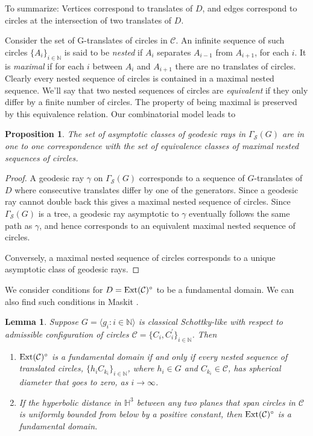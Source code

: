 \documentclass[12pt]{amsart}
\theoremstyle{plain}
\newtheorem{prop}[thm]{Proposition}
\newtheorem{lem}[thm]{Lemma}
\DeclareMathOperator{\Ext}{\rm Ext}
\begin{document}
To summarize: Vertices correspond to translates of $D$, and edges  correspond to circles at the intersection of two translates of $D$. 

  Consider the set of G-translates of circles in 
$\mathcal{C}$. An infinite sequence of such circles $\{A_i\}_{i \in \mathbb N}$ is said to be {\it nested} if $A_i$ separates  $A_{i-1}$ from $A_{i+1}$, for each $i$. It is 
{\it maximal} if for each $i$ between $A_i$ and $A_{i+1}$ there are no translates of circles.                                                                               
Clearly every nested sequence of circles is contained in a maximal nested sequence.  We'll say that two nested sequences of circles are {\it equivalent} if they only differ by a finite number of circles. The property of being maximal is preserved by this equivalence relation. 
Our combinatorial model leads to

\begin{prop}
The set of asymptotic classes of geodesic rays  in 
$\Gamma_{\mathcal{S}}(G)$ are in one to one correspondence with the set of equivalence classes of maximal nested sequences of circles. 
\end{prop}

\begin{proof}
A geodesic ray $\gamma$ on  $\Gamma_{\mathcal{S}} (G)$ corresponds to  a sequence of $G$-translates of $D$ where consecutive translates differ by one of the generators. Since a geodesic ray cannot double back this gives a maximal nested sequence of circles. Since  
$\Gamma_{\mathcal{S}} (G)$ is a tree, a geodesic ray asymptotic to $\gamma$ eventually follows the same path 
as $\gamma$, and hence corresponds to an equivalent maximal nested sequence of circles. 

Conversely, a maximal nested sequence of circles corresponds to 
a unique asymptotic class of geodesic rays.
\end{proof}

We consider conditions for $D=\Ext (\mathcal{C})^{\circ}$ to be a fundamental domain.
We can also find such conditions in Maskit \cite[Sect.VIII.A]{M}.

\begin{lem} \label{lem: fund domain}
Suppose $G =\langle g_i :i \in \mathbb N\rangle$ is classical Schottky-like  
with respect to admissible configuration of circles $\mathcal{C}=\{C_i ,C_i ^{\prime}\}_{i \in \mathbb N}$. Then
  
 \begin{enumerate}
  \item $\Ext (\mathcal{C})^{\circ}$ is a fundamental domain if and only if every nested sequence of translated circles, $\{h_i C_{k_i}\}_{i \in \mathbb N}$, where $h_i \in G$ and $C_{k_i} \in \mathcal{C}$, has 
  spherical diameter that goes to zero,  as $i  \rightarrow \infty$.
  \item  If the hyperbolic distance in
  $\mathbb{H}^3$ between any two planes that span circles in 
  $\mathcal{C}$ is uniformly bounded from below by a positive constant, then 
  $\Ext (\mathcal{C})^{\circ}$ is a fundamental domain.
 
\end{enumerate}
\end{lem}
\end{document}
